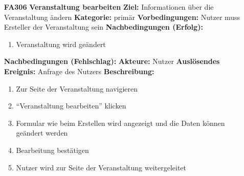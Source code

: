 \documentclass[parskip=full]{scrartcl}
\begin{document}
\begin{itemize}[nosep]
				
			\item[\textbf{FA306}]\textbf{Veranstaltung bearbeiten}
			\newline \textbf{Ziel:} Informationen über die Veranstaltung ändern
			\newline \textbf{Kategorie:} primär
			\newline \textbf{Vorbedingungen:} Nutzer muss Ersteller der Veranstaltung sein
			\newline \textbf{Nachbedingungen (Erfolg):} 
			\begin{enumerate}[nosep]
				\item Veranstaltung wird geändert 
			\end{enumerate}
			\textbf{Nachbedingungen (Fehlschlag):}
			\newline \textbf{Akteure:} Nutzer
			\newline \textbf{Auslösendes Ereignis:} Anfrage des Nutzers
			\newline \textbf{Beschreibung:}
			\begin{enumerate}[nosep]
				\item Zur Seite der Veranstaltung navigieren
				\item “Veranstaltung bearbeiten” klicken
				\item  Formular wie beim Erstellen wird angezeigt und die Daten können geändert werden
				\item Bearbeitung bestätigen
				\item Nutzer wird zur Seite der Veranstaltung weitergeleitet\\
			\end{enumerate}
				
								
			
				
						

\end{itemize}
\end{document}
